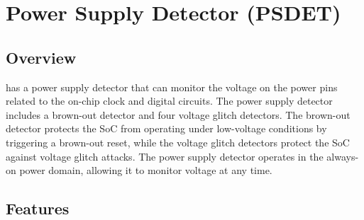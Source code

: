 \documentclass[main\_\_EN.tex]{subfiles}
\begin{document}

\ifglobal
\else
    \listoftodos
    {\let\clearpage\relax \listofdonetodos}
    \tableofcontents
\fi



\hypertarget{psdet}{}
\chapter{Power Supply Detector (PSDET)}
\label{mod:psdet}

\section{Overview}

\chipname{} has a power supply detector that can monitor the voltage on the power pins related to the on-chip clock and digital circuits. The power supply detector includes a brown-out detector and four voltage glitch detectors. The brown-out detector protects the SoC from operating under low-voltage conditions by triggering a brown-out reset, while the voltage glitch detectors protect the SoC against voltage glitch attacks. The power supply detector operates in the always-on power domain, allowing it to monitor voltage at any time.




\section{Features}
\label{sec:psdet-features}
\end{document}
